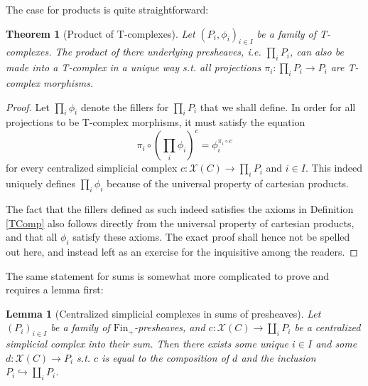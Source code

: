 \documentclass{article}
\newtheorem{theorem}{Theorem}[subsection]
\newtheorem{lemma}{Lemma}[subsection]
\theoremstyle{remark}
\theoremstyle{definition}
\newcommand{\Fin}{\mathrm{Fin}}
\newcommand{\X}{\mathcal X}
\begin{document}
	The case for products is quite straightforward:
	\begin{theorem}[Product of T-complexes]
		Let $(P_i,\phi_i)_{i\in I}$ be a family of T-complexes. The product of there underlying presheaves, i.e. $\prod_iP_i$, can also be made into a T-complex in a unique way s.t. all projections $\pi_i:\prod_iP_i\to P_i$ are T-complex morphisms.
	\end{theorem}
	\begin{proof}
		Let $\prod_i\phi_i$ denote the fillers for $\prod_iP_i$ that we shall define. In order for all projections to be T-complex morphisms, it must satisfy the equation
		\begin{equation}\label{prodfill}
			\pi_i\circ\left(\prod_i\phi_i\right)^c=\phi_i^{\pi_i\circ c}
		\end{equation}
		for every centralized simplicial complex $c:\X(C)\to\prod_iP_i$ and $i\in I$. This indeed uniquely defines $\prod_i\phi_i$ because of the universal property of cartesian products.
		
		The fact that the fillers defined as such indeed satisfies the axioms in Definition \ref{TComp} also follows directly from the universal property of cartesian products, and that all $\phi_i$ satisfy these axioms. The exact proof shall hence not be spelled out here, and instead left as an exercise for the inquisitive among the readers.
	\end{proof}
	The same statement for sums is somewhat more complicated to prove and requires a lemma first:
	\begin{lemma}[Centralized simplicial complexes in sums of presheaves]\label{cscsum}
		Let $(P_i)_{i\in I}$ be a family of $\Fin_+$-presheaves, and $c:\X(C)\to\coprod_iP_i$ be a centralized simplicial complex into their sum. Then there exists some unique $i\in I$ and some $d:\X(C)\to P_i$ s.t. $c$ is equal to the composition of $d$ and the inclusion $P_i\hookrightarrow\coprod_iP_i$.
	\end{lemma}
\end{document}
